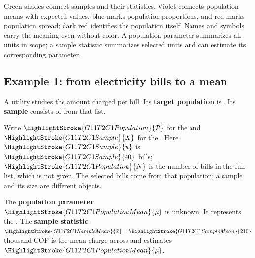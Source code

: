     Green shades connect samples and their statistics. Violet connects population means with expected values, blue marks population proportions, and red marks population spread; dark red identifies the population itself. Names and symbols carry the meaning even without color. A population parameter summarizes all units in scope; a sample statistic summarizes selected units and can estimate its corresponding parameter.


    \subsection{Example 1: from electricity bills to a mean}
	\label{subsec:c1-population-and-sample}




	{\ifGTenHighlights\raggedright\fi A utility studies the amount charged per bill. Its \textbf{target population} is  . Its \textbf{sample} consists of  from that list.\par}

    Write $\HighlightStroke{G11T2C1Population}{\mathcal{P}}$ for the  and $\HighlightStroke{G11T2C1Sample}{X}$ for the . Here $\HighlightStroke{G11T2C1Sample}{n}$ is $\HighlightStroke{G11T2C1Sample}{40}$ bills; $\HighlightStroke{G11T2C1Population}{N}$ is the number of bills in the full list, which is not given. The selected bills come from that population; a sample and its size are different objects.

	The \textbf{population parameter} $\HighlightStroke{G11T2C1PopulationMean}{\mu}$ is unknown. It represents the   . The \textbf{sample statistic} $\HighlightStroke{G11T2C1SampleMean}{\bar{x}}=\HighlightStroke{G11T2C1SampleMean}{210}$ thousand COP is the mean charge across  and estimates $\HighlightStroke{G11T2C1PopulationMean}{\mu}$.

